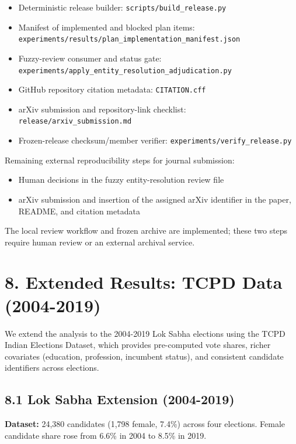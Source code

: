 \documentclass[
]{article}
\providecommand{\tightlist}{%
  \setlength{\itemsep}{0pt}\setlength{\parskip}{0pt}}
\begin{document}
\begin{itemize}
  Snapshot manifest: \texttt{release/frozen\_snapshot\_manifest.json}
\item
  Deterministic release builder: \texttt{scripts/build\_release.py}
\item
  Manifest of implemented and blocked plan items: \texttt{experiments/results/plan\_implementation\_manifest.json}
\item
  Fuzzy-review consumer and status gate: \texttt{experiments/apply\_entity\_resolution\_adjudication.py}
\item
  GitHub repository citation metadata: \texttt{CITATION.cff}
\item
  arXiv submission and repository-link checklist: \texttt{release/arxiv\_submission.md}
\item
  Frozen-release checksum/member verifier: \texttt{experiments/verify\_release.py}
\end{itemize}

Remaining external reproducibility steps for journal submission:

\begin{itemize}
\tightlist
\item
  Human decisions in the fuzzy entity-resolution review file
\item
  arXiv submission and insertion of the assigned arXiv identifier in the paper, README, and citation metadata
\end{itemize}

The local review workflow and frozen archive are implemented; these two steps require human review or an external archival service.

\section{8. Extended Results: TCPD Data (2004-2019)}\label{8-extended-results-tcpd-data-2004-2019}

We extend the analysis to the 2004-2019 Lok Sabha elections using the TCPD Indian Elections Dataset, which provides pre-computed vote shares, richer covariates (education, profession, incumbent status), and consistent candidate identifiers across elections.

\subsection{8.1 Lok Sabha Extension (2004-2019)}\label{81-lok-sabha-extension-2004-2019}

\textbf{Dataset:} 24,380 candidates (1,798 female, 7.4\%) across four elections. Female candidate share rose from 6.6\% in 2004 to 8.5\% in 2019.
\end{document}
